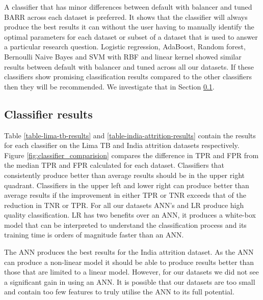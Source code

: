 \documentclass{sig-alternate-05-2015}
\begin{document}
	
	A classifier that has minor differences between default with balancer and tuned BARR across each dataset is preferred. It shows that the classifier will always produce the best results it can without the user having to manually identify the optimal parameters for each dataset or subset of a dataset that is used to answer a particular research question. Logistic regression, AdaBoost, Random forest, Bernoulli Naive Bayes and SVM with RBF and linear kernel showed similar results between default with balancer and tuned across all our datasets. If these classifiers show promising classification results compared to the other classifiers then they will be recommended. We investigate that in Section \ref{classifier-results}.

	\subsection{Classifier results}
	\label{classifier-results}
	Table \ref{table-lima-tb-results} and \ref{table-india-attrition-results} contain the results for each classifier on the Lima TB and India attrition datasets respectively. Figure \ref{fig:classifier_comparision} compares the difference in TPR and FPR from the median TPR and FPR calculated for each dataset. Classifiers that consistently produce better than average results should be in the upper right quadrant. Classifiers in the upper left and lower right can produce better than average results if the improvement in either TPR or TNR exceeds that of the reduction in TNR or TPR. For all our datasets ANN's and LR produce high quality classification. LR has two benefits over an ANN, it produces a white-box model that can be interpreted to understand the classification process \cite{Dreiseitl2002352} and its training time is orders of magnitude faster than an ANN.
	 
	The ANN produces the best results for the India attrition dataset. As the ANN can produce a non-linear model it should be able to produce results better than those that are limited to a linear model. However, for our datasets we did not see a significant gain in using an ANN. It is possible that our datasets are too small and contain too few features to truly utilise the ANN to its full potential. 
	
\end{document}
